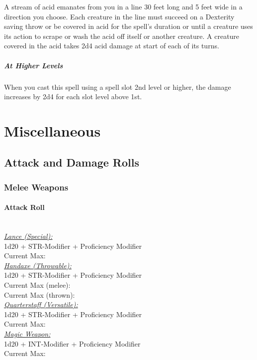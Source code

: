 \documentclass[letterpaper,openany,oneside,twocolumn]{book}
\begin{document}
A stream of acid emanates from you in a line 30 feet long and 5 feet wide in a direction you choose. Each creature in the line must succeed on a Dexterity saving throw or be covered in acid for the spell's duration or until a creature uses its action to scrape or wash the acid off itself or another creature. A creature covered in the acid takes 2d4 acid damage at start of each of its turns.

\subparagraph*{At Higher Levels} When you cast this spell using a spell slot 2nd level or higher, the damage increases by 2d4 for each slot level above 1st.

\vfill\eject
\section*{Miscellaneous}
\subsection*{Attack and Damage Rolls}
\subsubsection*{Melee Weapons}
\paragraph*{Attack Roll}\hfill\\
\underline{\textit{Lance (Special):}}\\
1d20 + STR-Modifier + Proficiency Modifier\\
\indent Current Max: 
\\
\underline{\textit{Handaxe (Throwable):}}\\
1d20 + STR-Modifier + Proficiency Modifier\\
\indent Current Max (melee): \\
\indent Current Max (thrown): 
\\
\underline{\textit{Quarterstaff (Versatile):}}\\
1d20 + STR-Modifier + Proficiency Modifier\\
\indent Current Max: 
\\
\underline{\textit{Magic Weapon:}}\\
1d20 + INT-Modifier + Proficiency Modifier\\
\indent Current Max: 
\end{document}
